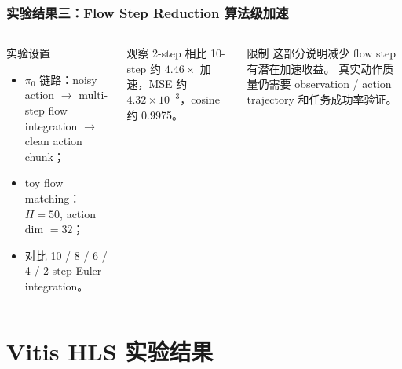 \documentclass[10pt, aspectratio=169]{beamer}
\begin{document}
\begin{frame}
  \frametitle{实验结果三：Flow Step Reduction 算法级加速}
  \small
  \begin{columns}[T,onlytextwidth]
    \begin{block}{实验设置}
      \begin{itemize}
        \item $\pi_0$ 链路：noisy action $\rightarrow$ multi-step flow integration $\rightarrow$ clean action chunk；
        \item toy flow matching：$H=50$, action dim $=32$；
        \item 对比 10 / 8 / 6 / 4 / 2 step Euler integration。
      \end{itemize}
    \end{block}

    \begin{exampleblock}{观察}
      2-step 相比 10-step 约 $4.46\times$ 加速，MSE 约 $4.32\times10^{-3}$，cosine 约 0.9975。
    \end{exampleblock}

    \begin{alertblock}{限制}
      这部分说明减少 flow step 有潜在加速收益。
      真实动作质量仍需要 observation / action trajectory 和任务成功率验证。
    \end{alertblock}
  \end{columns}
\end{frame}

\section{Vitis HLS 实验结果}
\end{document}
